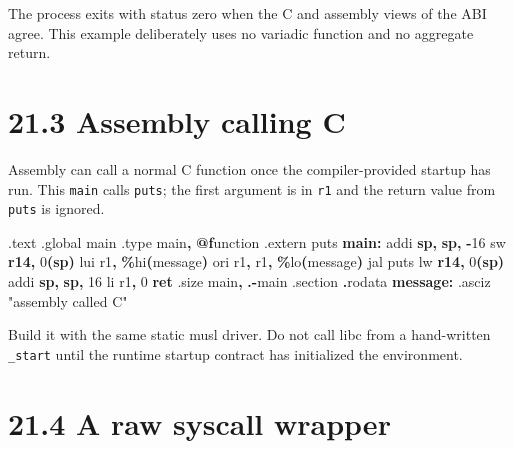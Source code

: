 \documentclass[
  oneside,
  openany]{book}
\newenvironment{Shaded}{\begin{snugshade}}{\end{snugshade}}
\newcommand{\BuiltInTok}[1]{#1}
\newcommand{\ControlFlowTok}[1]{\textcolor[rgb]{0.13,0.29,0.53}{\textbf{#1}}}
\newcommand{\DecValTok}[1]{\textcolor[rgb]{0.00,0.00,0.81}{#1}}
\newcommand{\FunctionTok}[1]{\textcolor[rgb]{0.13,0.29,0.53}{\textbf{#1}}}
\newcommand{\KeywordTok}[1]{\textcolor[rgb]{0.13,0.29,0.53}{\textbf{#1}}}
\newcommand{\NormalTok}[1]{#1}
\newcommand{\OperatorTok}[1]{\textcolor[rgb]{0.81,0.36,0.00}{\textbf{#1}}}
\newcommand{\StringTok}[1]{\textcolor[rgb]{0.31,0.60,0.02}{#1}}
\begin{document}
The process exits with status zero when the C and assembly views of the
ABI agree. This example deliberately uses no variadic function and no
aggregate return.

\hypertarget{assembly-calling-c}{%
\section{21.3 Assembly calling C}\label{assembly-calling-c}}

Assembly can call a normal C function once the compiler-provided startup
has run. This \texttt{main} calls \texttt{puts}; the first argument is
in \texttt{r1} and the return value from \texttt{puts} is ignored.

\begin{Shaded}
\begin{Highlighting}[]
\NormalTok{.text}
\NormalTok{.global main}
\NormalTok{.type main}\OperatorTok{,} \FunctionTok{@f}\NormalTok{unction}
\NormalTok{.extern puts}
\FunctionTok{main:}
\NormalTok{        addi }\KeywordTok{sp}\OperatorTok{,} \KeywordTok{sp}\OperatorTok{,} \OperatorTok{{-}}\DecValTok{16}
\NormalTok{        sw   }\KeywordTok{r14}\OperatorTok{,} \DecValTok{0}\OperatorTok{(}\KeywordTok{sp}\OperatorTok{)}
\NormalTok{        lui  r1}\OperatorTok{,} \OperatorTok{\%}\NormalTok{hi}\OperatorTok{(}\NormalTok{message}\OperatorTok{)}
\NormalTok{        ori  r1}\OperatorTok{,}\NormalTok{ r1}\OperatorTok{,} \OperatorTok{\%}\NormalTok{lo}\OperatorTok{(}\NormalTok{message}\OperatorTok{)}
\NormalTok{        jal  puts}
\NormalTok{        lw   }\KeywordTok{r14}\OperatorTok{,} \DecValTok{0}\OperatorTok{(}\KeywordTok{sp}\OperatorTok{)}
\NormalTok{        addi }\KeywordTok{sp}\OperatorTok{,} \KeywordTok{sp}\OperatorTok{,} \DecValTok{16}
\NormalTok{        li   r1}\OperatorTok{,} \DecValTok{0}
        \ControlFlowTok{ret}
\NormalTok{.size main}\OperatorTok{,} \OperatorTok{.{-}}\NormalTok{main}
\NormalTok{.}\BuiltInTok{section} \OperatorTok{.}\NormalTok{rodata}
\FunctionTok{message:}\NormalTok{ .asciz }\StringTok{"assembly called C"}
\end{Highlighting}
\end{Shaded}

Build it with the same static musl driver. Do not call libc from a
hand-written \texttt{\_start} until the runtime startup contract has
initialized the environment.

\hypertarget{a-raw-syscall-wrapper}{%
\section{21.4 A raw syscall wrapper}\label{a-raw-syscall-wrapper}}
\end{document}
